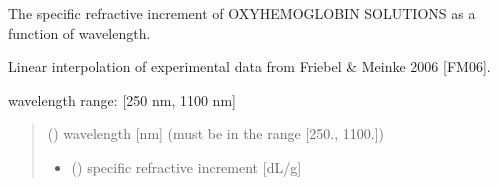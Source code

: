 \documentclass[letterpaper,10pt,english]{sphinxmanual}
\begin{document}
\begin{fulllineitems}
\label{\detokenize{05_refractive_index:skinoptics.refractive_index.beta_oxy_Friebel}}
\pysigstartsignatures
{}
\pysigstopsignatures
\begin{DUlineblock}{0em}
\item[] The specific refractive increment of OXY\sphinxhyphen{}HEMOGLOBIN SOLUTIONS as a function of wavelength.
\item[] Linear interpolation of experimental data from Friebel \& Meinke 2006 {[}FM06{]}.
\end{DUlineblock}

\begin{DUlineblock}{0em}
\item[] wavelength range: {[}250 nm, 1100 nm{]}
\end{DUlineblock}
\begin{quote}\begin{description}
\sphinxAtStartPar
{} () \textendash{} wavelength {[}nm{]} (must be in the range {[}250., 1100.{]})

\sphinxAtStartPar
\begin{itemize}
\item {} 
\sphinxAtStartPar
{} () \textendash{} specific refractive increment {[}dL/g{]}

\end{itemize}


\end{description}\end{quote}

\end{fulllineitems}

\end{document}

